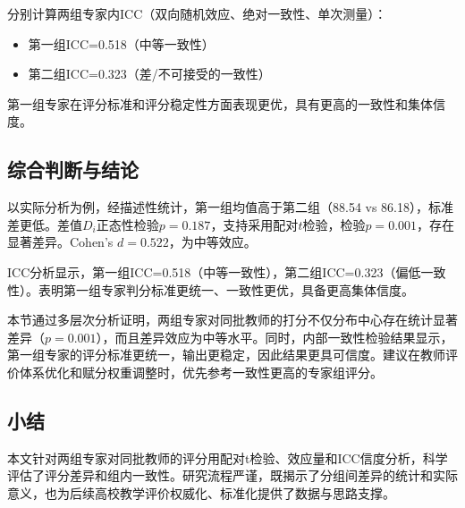 分别计算两组专家内ICC（双向随机效应、绝对一致性、单次测量）：
\begin{itemize}
    \item 第一组ICC=0.518（中等一致性）
    \item 第二组ICC=0.323（差/不可接受的一致性）
\end{itemize}
第一组专家在评分标准和评分稳定性方面表现更优，具有更高的一致性和集体信度。

\subsection{综合判断与结论}
以实际分析为例，经描述性统计，第一组均值高于第二组（88.54 vs 86.18），标准差更低。差值$D_i$正态性检验$p=0.187$，支持采用配对$t$检验，检验$p=0.001$，存在显著差异。Cohen's $d=0.522$，为中等效应。

ICC分析显示，第一组ICC=0.518（中等一致性），第二组ICC=0.323（偏低一致性）。表明第一组专家判分标准更统一、一致性更优，具备更高集体信度。

本节通过多层次分析证明，两组专家对同批教师的打分不仅分布中心存在统计显著差异（$p=0.001$），而且差异效应为中等水平。同时，内部一致性检验结果显示，第一组专家的评分标准更统一，输出更稳定，因此结果更具可信度。建议在教师评价体系优化和赋分权重调整时，优先参考一致性更高的专家组评分。





\subsection{小结}
本文针对两组专家对同批教师的评分用配对t检验、效应量和ICC信度分析，科学评估了评分差异和组内一致性。研究流程严谨，既揭示了分组间差异的统计和实际意义，也为后续高校教学评价权威化、标准化提供了数据与思路支撑。





